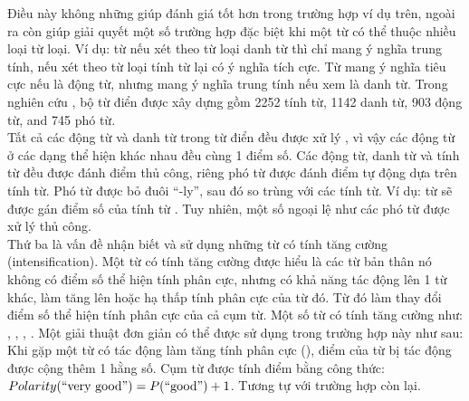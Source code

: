 Điều này không những giúp đánh giá tốt hơn trong trường hợp ví dụ trên, ngoài ra còn giúp giải quyết một số trường hợp đặc biệt khi một từ có thể thuộc nhiều loại từ loại. Ví dụ: từ  nếu xét theo từ loại danh từ thì chỉ mang ý nghĩa trung tính, nếu xét theo từ loại tính từ lại có ý nghĩa tích cực. Từ  mang ý nghĩa tiêu cực nếu là động từ, nhưng mang ý nghĩa trung tính nếu xem là danh từ. Trong nghiên cứu \cite{taboada2011lexicon}, bộ từ điển được xây dựng gồm 2252 tính từ, 1142 danh từ, 903 động từ, and 745 phó từ. \\

Tất cả các động từ và danh từ trong từ điển đều được xử lý , vì vậy các động từ ở các dạng thể hiện khác nhau đều cùng 1 điểm số. Các động từ, danh từ và tính từ đều được đánh điểm thủ công, riêng phó từ được đánh điểm tự động dựa trên tính từ. Phó từ được bỏ đuôi ``-ly'', sau đó so trùng với các tính từ. Ví dụ: từ  sẽ được gán điểm số của tính từ . Tuy nhiên, một số ngoại lệ như các phó từ  được xử lý thủ công. \\

Thứ ba là vấn đề nhận biết và sử dụng những từ có tính tăng cường (intensification). Một từ có tính tăng cường được hiểu là các từ bản thân nó không có điểm số thể hiện tính phân cực, nhưng có khả năng tác động lên 1 từ khác, làm tăng lên hoặc hạ thấp tính phân cực của từ đó. Từ đó làm thay đổi điểm số thể hiện tính phân cực của cả cụm từ. Một số từ có tính tăng cường như: , , , . Một giải thuật đơn giản có thể được sử dụng trong trường hợp này như sau:
Khi gặp một từ có tác động làm tăng tính phân cực (), điểm của từ bị tác động được cộng thêm 1 hằng số. 
Cụm từ  được tính điểm bằng công thức: $Polarity(\text{{``very good''}}) = P(\text{{``good''}}) + 1$.
Tương tự với trường hợp còn lại. \\

